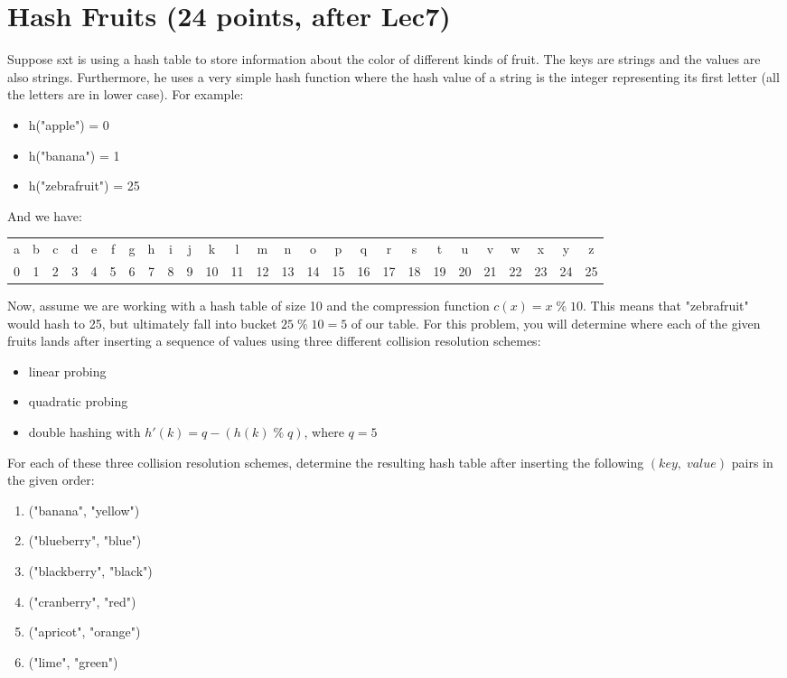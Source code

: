 \documentclass[11pt]{exam}
\begin{document}
\section{Hash Fruits (24 points, after Lec7)}
Suppose sxt is using a hash table to store information about the color of different kinds of fruit. The keys are strings and the values are also strings. Furthermore, he uses a very simple hash function where the hash value of a string is the integer representing its first letter (all the letters are in lower case). For example:
\begin{itemize}
\item h("apple") = 0
\item h("banana") = 1
\item h("zebrafruit") = 25
\end{itemize}

And we have:
\begin{table}[H]
\centering
\setlength{\tabcolsep}{1mm}
\begin{tabular}{cccccccccccccccccccccccccc}
a&b&c&d&e&f&g&h&i&j&k&l&m&n&o&p&q&r&s&t&u&v&w&x&y&z\\
0&1&2&3&4&5&6&7&8&9&10&11&12&13&14&15&16&17&18&19&20&21&22&23&24&25
\end{tabular}
\end{table}
Now, assume we are working with a hash table of size 10 and the compression function $c(x) = x \;\%\; 10$. This means that "zebrafruit" would hash to 25, but ultimately fall into bucket $25 \;\%\; 10 = 5$ of our table. For this problem, you will determine where each of the given fruits lands after inserting a sequence of values using three different collision resolution schemes:

\begin{itemize}
\item linear probing
\item quadratic probing
\item double hashing with $h'(k) = q - (h(k) \;\%\; q)$, where $q=5$
\end{itemize}

For each of these three collision resolution schemes, determine the resulting hash table after inserting the following $(key,\;value)$ pairs in the given order:
\begin{enumerate}[1.]
\item ("banana", "yellow")
\item ("blueberry", "blue")
\item ("blackberry", "black")
\item ("cranberry", "red")
\item ("apricot", "orange")
\item ("lime", "green")
\end{enumerate}
\end{document}

